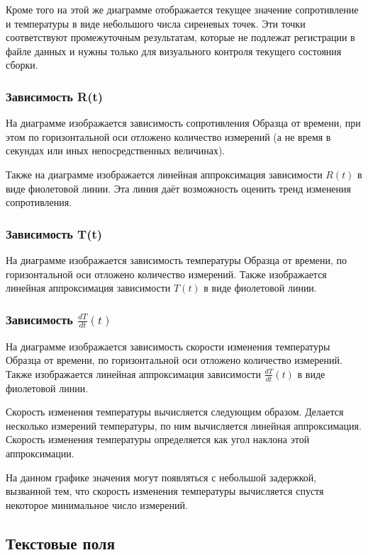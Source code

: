 \documentclass[12pt, a4paper, twocolumn]{report}
\begin{document}
Кроме того на этой же диаграмме отображается текущее значение сопротивление и температуры в виде небольшого числа сиреневых точек. Эти точки соответствуют промежуточным результатам, которые не подлежат регистрации в файле данных и нужны только для визуального контроля текущего состояния сборки.

\subsubsection{Зависимость R(t)}

На диаграмме изображается зависимость сопротивления Образца от времени, при этом по горизонтальной оси отложено количество измерений (а не время в секундах или иных непосредственных величинах).

Также на диаграмме изображается линейная аппроксимация зависимости $R(t)$ в виде фиолетовой линии. Эта линия даёт возможность оценить тренд изменения сопротивления.

\subsubsection{Зависимость T(t)}

На диаграмме изображается зависимость температуры Образца от времени, по горизонтальной оси отложено количество измерений. Также изображается линейная аппроксимация зависимости $T(t)$ в виде фиолетовой линии.

\subsubsection{Зависимость $\frac{dT}{dt}(t)$}

На диаграмме изображается зависимость скорости изменения температуры Образца от времени, по горизонтальной оси отложено количество измерений. Также изображается линейная аппроксимация зависимости $\frac{dT}{dt}(t)$ в виде фиолетовой линии.

Скорость изменения температуры вычисляется следующим образом. Делается несколько измерений температуры, по ним вычисляется линейная аппроксимация. Скорость изменения температуры определяется как угол наклона этой аппроксимации.

На данном графике значения могут появляться с небольшой задержкой, вызванной тем, что скорость изменения температуры вычисляется спустя некоторое минимальное число измерений.

\subsection{Текстовые поля}
\end{document}
